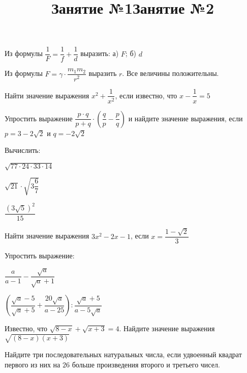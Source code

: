 \title{Занятие №1}
\begin{listofex}
	\item {}
	\item Из формулы \( \dfrac{1}{F}=\dfrac{1}{f}+\dfrac{1}{d} \) выразить: а) \( F \); б) \( d \)
	\item Из формулы \( F=\gamma\cdot\dfrac{m_1m_2}{r^2} \) выразить \( r \). Все величины положительны.
	\item Найти значение выражения \( x^2+\dfrac{1}{x^2} \), если известно, что \( x-\dfrac{1}{x}=5 \)
	\item {}
	\item {}
	\item Упростить выражение \( \dfrac{p\cdot q}{p+q}\cdot\left( \dfrac{q}{p}-\dfrac{p}{q} \right) \) и найдите значение выражения, если \( p=3-2\sqrt{2} \) и \( q=-2\sqrt{2} \)
	\item Вычислить:
	\begin{enumcols}[itemcolumns=3]
		\item \( \sqrt{77\cdot24\cdot33\cdot14} \)
		\item \( \sqrt{21}\cdot\sqrt{3\dfrac{6}{7}} \)
		\item \( \dfrac{(3\sqrt{5})^2}{15} \)
	\end{enumcols}
	\item Найти значение выражения \( 3x^2-2x-1 \), если \( x=\dfrac{1-\sqrt{2}}{3} \)
	\item Упростить выражение:
	\begin{enumcols}[itemcolumns=2]
		\item \( \dfrac{a}{a-1}-\dfrac{\sqrt{a}}{\sqrt{a}+1} \)
		\item \( \left( \dfrac{\sqrt{a}-5}{\sqrt{a}+5}+\dfrac{20\sqrt{a}}{a-25} \right):\dfrac{\sqrt{a}+5}{a-5\sqrt{a}} \)
	\end{enumcols}

	\item Известно, что \( \sqrt{8-x}+\sqrt{x+3}=4 \). Найдите значение выражения \( \sqrt{(8-x)(x+3)} \)
	
	\item Найдите три последовательных натуральных числа, если удвоенный квадрат
	первого из них на \( 26 \) больше произведения второго и третьего чисел.
\end{listofex}
\newpage
\title{Занятие №2}
